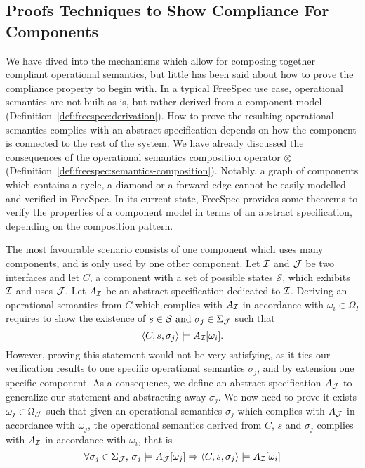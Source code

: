 \subsection{Proofs Techniques to Show Compliance For Components}

We have dived into the mechanisms which allow for composing together compliant
operational semantics, but little has been said about how to prove the
compliance property to begin with.
%
In a typical FreeSpec use case, operational semantics are not built as-is, but
rather derived from a component model (Definition~\ref{def:freespec:derivation}).
%
How to prove the resulting operational semantics complies with an abstract
specification depends on how the component is connected to the rest of the
system.
%
We have already discussed the consequences of the operational semantics
composition operator $\otimes$ (Definition~\ref{def:freespec:semantics-composition}).
%
Notably, a graph of components which contains a cycle, a diamond or a forward
edge cannot be easily modelled and verified in FreeSpec.
%
In its current state, FreeSpec provides some theorems to verify the properties
of a component model in terms of an abstract specification, depending on the
composition pattern.

The most favourable scenario consists of one component which uses many
components, and is only used by one other component.
%
Let $\mathcal{I}$ and $\mathcal{J}$ be two interfaces and let $C$, a component with a set of
possible states $\mathcal{S}$, which exhibits $\mathcal{I}$ and uses $\mathcal{J}$.
%
Let $A_{\mathcal{I}}$ be an abstract specification dedicated to $\mathcal{I}$.
%
Deriving an operational semantics from $C$ which complies with $A_{\mathcal{I}}$ in
accordance with $\omega_i \in \Omega_I$ requires to show the existence of $s \in
\mathcal{S} \text{ and }\sigma_j \in \Sigma_{\mathcal{J}}$ such that \[ \langle
C, s, \sigma_j \rangle \models A_{\mathcal{I}}[\omega_i]. \]
%
However, proving this statement would not be very satisfying, as it ties our
verification results to one specific operational semantics $\sigma_j$, and by
extension one specific component.
%
As a consequence, we define an abstract specification $A_{\mathcal{J}}$ to
generalize our statement and abstracting away $\sigma_j$.
%
We now need to prove it exists $\omega_j \in \Omega_{\mathcal{J}}$ such that
given an operational semantics $\sigma_j$ which complies with $A_{\mathcal{J}}$
in accordance with $\omega_j$, the operational semantics derived from $C$, $s$
and $\sigma_j$ complies with $A_{\mathcal{I}}$ in accordance with $\omega_i$, that is \[
  \forall \sigma_j \in \Sigma_{\mathcal{J}}\text{, }\sigma_j \models
  A_{\mathcal{J}}[\omega_j] \Rightarrow \langle C, s, \sigma_j \rangle \models
  A_{\mathcal{I}}[\omega_i]
\]

